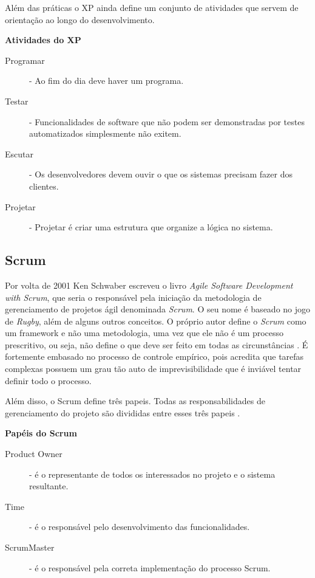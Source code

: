 \documentclass[
	article,			%
	11pt,				%
	oneside,			%
	a4paper,			%
	english,			%
	brazil,				%
	sumario=tradicional
	]{abntex2}
\begin{document}
Além das práticas o XP ainda define um conjunto de atividades que servem de
orientação ao longo do desenvolvimento.

\textbf{Atividades do XP}

\begin{description}
   \item[Programar] - Ao fim do dia deve haver um programa.
   \item[Testar] - Funcionalidades de software que não podem ser demonstradas
   por testes automatizados simplesmente não exitem.
   \item[Escutar] - Os desenvolvedores devem ouvir o que os sistemas precisam
   fazer dos clientes.
   \item[Projetar] - Projetar é criar uma estrutura que organize a lógica no
   sistema.
\end{description}

\subsection{Scrum}

Por volta de 2001 Ken Schwaber escreveu o livro \textit{Agile Software
Development with Scrum}, que seria o responsável pela iniciação da metodologia
de gerenciamento de projetos ágil denominada \textit{Scrum}. O seu nome é
baseado no jogo de \textit{Rugby}, além de alguns outros conceitos. O próprio
autor define o \textit{Scrum} como um framework e não uma metodologia, uma vez
que ele não é um processo prescritivo, ou seja, não define o que deve ser feito
em todas as circunstâncias \cite{schwaber2002agile}. É fortemente embasado no
processo de controle empírico, pois acredita que tarefas complexas possuem um
grau tão auto de imprevisibilidade que é inviável tentar definir todo o
processo.

Além disso, o Scrum define três papeis. Todas as responsabilidades de
gerenciamento do projeto são divididas entre esses três papeis
\cite{schwaber2002agile}.

\textbf{Papéis do Scrum}

\begin{description}
   \item[Product Owner] - é o representante de todos os interessados no projeto
   e o sistema resultante.
   \item[Time] - é o responsável pelo desenvolvimento das funcionalidades.
   \item[ScrumMaster] - é o responsável pela correta implementação do processo
   Scrum.
\end{description}
\end{document}
